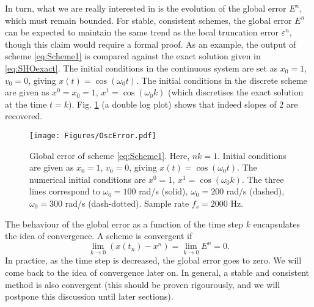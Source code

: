 \documentclass[11pt,twoside,a4paper,english]{book}
\begin{document}
In turn, what we are really interested in is the evolution of the global error $E^n$, which must remain bounded. For stable, consistent schemes, the global error $E^n$ can be expected to maintain the same trend as the local truncation error $\varepsilon^n$, though this claim would require a formal proof. As an example, the output of scheme \eqref{eq:Scheme1} is compared against the exact solution given in \eqref{eq:SHOexact}. The initial conditions in the continuous system are set as $x_0 =1$, $v_0 = 0$, giving $x(t) = \cos(\omega_0 t)$. The initial conditions in the discrete scheme are given as $x^0 = x_0 = 1$, $x^1 = \cos(\omega_0 k)$ (which discretises the exact solution at the time $t=k$). Fig. \ref{fig:SHOerrs} (a double log plot) shows that indeed slopes of 2 are recovered.


\begin{figure}
    \texttt{[image: Figures/OscError.pdf]}
    \caption{Global error of scheme \eqref{eq:Scheme1}. Here, $nk = 1$. Initial conditions are given as $x_0 = 1$, $v_0 = 0$, giving $x(t) = \cos(\omega_0 t)$. The numerical initial conditions are $x^0 = 1$, $x^1 = \cos(\omega_0 k)$. The three lines correspond to $\omega_0 = 100$ rad/s (solid), $\omega_0 = 200$ rad/s (dashed), $\omega_0 = 300$ rad/s (dash-dotted). Sample rate $f_s = 2000$ Hz.}\label{fig:SHOerrs}
\end{figure}



The behaviour of the global error as a function of the time step $k$ encapsulates the idea of convergence. A scheme is convergent if 
\begin{equation}\label{eq:convDef}
    \lim_{k\rightarrow 0} (x(t_n)-x^n) = \lim_{k\rightarrow 0} E^n = 0.
\end{equation}
In practice, as the time step is decreased, the global error goes to zero. We will come back to the idea of convergence later on. In general, a stable and consistent method is also convergent (this should be proven rigourously, and we will postpone this discussion until later sections).  
\end{document}

